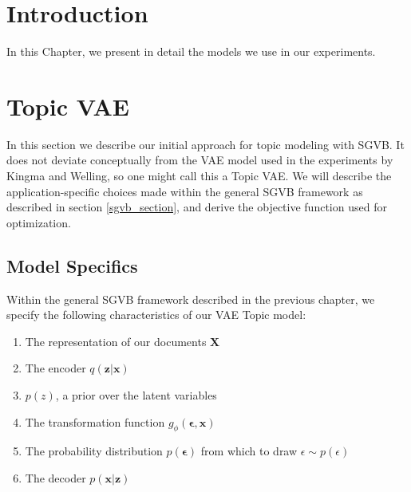 \documentclass{report}
\begin{document}
\section{Introduction}
In this Chapter, we present in detail the models we use in our experiments. 

\section{Topic VAE}

In this section we describe our initial approach for topic modeling with SGVB. It does not deviate conceptually from the VAE model used in the experiments by Kingma and Welling\cite{kingma2013auto}, so one might call this a Topic VAE. We will describe the application-specific choices made within the general SGVB framework as described in section \ref{sgvb_section}, and derive the objective function used for optimization. 

\subsection{Model Specifics}

Within the general SGVB framework described in the previous chapter, we specify the following characteristics of our VAE Topic model:

\begin{enumerate}
	\item The representation of our documents $\mathbf{X}$
	\item The encoder $q(\mathbf{z}|\mathbf{x})$
	\item $p(z)$, a prior  over the latent variables
	\item The transformation function $g_\phi(\boldsymbol{\epsilon},\mathbf{x})$
	\item The  probability distribution  $p(\mathbf{\epsilon})$ from which to draw $\epsilon \sim p(\epsilon)$
	\item The decoder $p(\mathbf{x}|\mathbf{z})$
\end{enumerate}
\end{document}
